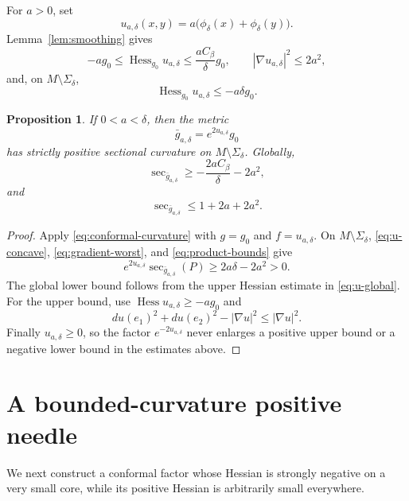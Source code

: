 \documentclass[11pt]{amsart}
\newtheorem{proposition}[theorem]{Proposition}
\theoremstyle{definition}
\newcommand{\Hess}{\operatorname{Hess}}
\begin{document}
For $a>0$, set
\begin{equation}\label{eq:u-def}
 u_{a,\delta}(x,y)
 =a\bigl(\phi_\delta(x)+\phi_\delta(y)\bigr).
\end{equation}
Lemma~\ref{lem:smoothing} gives
\begin{equation}\label{eq:u-global}
 -ag_0\le\Hess_{g_0}u_{a,\delta}
 \le\frac{aC_\beta}{\delta}g_0,
 \qquad
 |\nabla u_{a,\delta}|^2\le2a^2,
\end{equation}
and, on $M\setminus\Sigma_\delta$,
\begin{equation}\label{eq:u-concave}
 \Hess_{g_0}u_{a,\delta}\le-a\delta g_0.
\end{equation}

\begin{proposition}\label{prop:base-conformal}
If $0<a<\delta$, then the metric
\[
 \bar g_{a,\delta}=e^{2u_{a,\delta}}g_0
\]
has strictly positive sectional curvature on
$M\setminus\Sigma_\delta$.  Globally,
\begin{equation}\label{eq:base-lower}
 \sec_{\bar g_{a,\delta}}
 \ge-\frac{2aC_\beta}{\delta}-2a^2,
\end{equation}
and
\begin{equation}\label{eq:base-upper}
 \sec_{\bar g_{a,\delta}}\le1+2a+2a^2.
\end{equation}
\end{proposition}

\begin{proof}
Apply \eqref{eq:conformal-curvature} with $g=g_0$ and
$f=u_{a,\delta}$.  On $M\setminus\Sigma_\delta$,
\eqref{eq:u-concave}, \eqref{eq:gradient-worst}, and
\eqref{eq:product-bounds} give
\[
 e^{2u_{a,\delta}}\sec_{\bar g_{a,\delta}}(P)
 \ge2a\delta-2a^2>0.
\]
The global lower bound follows from the upper Hessian estimate in
\eqref{eq:u-global}.  For the upper bound, use
$\Hess u_{a,\delta}\ge-ag_0$ and
\[
 du(e_1)^2+du(e_2)^2-|\nabla u|^2\le|\nabla u|^2.
\]
Finally $u_{a,\delta}\ge0$, so the factor $e^{-2u_{a,\delta}}$ never enlarges a positive upper bound or a negative lower bound in the estimates above.
\end{proof}

\section{A bounded-curvature positive needle}

We next construct a conformal factor whose Hessian is strongly negative on a very small core, while its positive Hessian is arbitrarily small everywhere.
\end{document}
